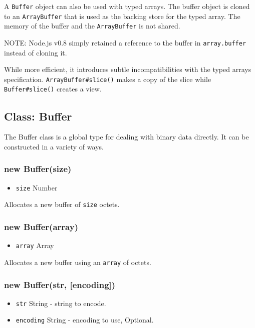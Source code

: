 A \texttt{Buffer} object can also be used with typed arrays. The buffer
object is cloned to an \texttt{ArrayBuffer} that is used as the backing
store for the typed array. The memory of the buffer and the
\texttt{ArrayBuffer} is not shared.

NOTE: Node.js v0.8 simply retained a reference to the buffer in
\texttt{array.buffer} instead of cloning it.

While more efficient, it introduces subtle incompatibilities with the
typed arrays specification. \texttt{ArrayBuffer\#slice()} makes a copy
of the slice while \texttt{Buffer\#slice()} creates a view.

\subsection{Class: Buffer}

The Buffer class is a global type for dealing with binary data directly.
It can be constructed in a variety of ways.

\subsubsection{new Buffer(size)}

\begin{itemize}
\item
  \texttt{size} Number
\end{itemize}

Allocates a new buffer of \texttt{size} octets.

\subsubsection{new Buffer(array)}

\begin{itemize}
\item
  \texttt{array} Array
\end{itemize}

Allocates a new buffer using an \texttt{array} of octets.

\subsubsection{new Buffer(str, {[}encoding{]})}

\begin{itemize}
\item
  \texttt{str} String - string to encode.
\item
  \texttt{encoding} String - encoding to use, Optional.
\end{itemize}

